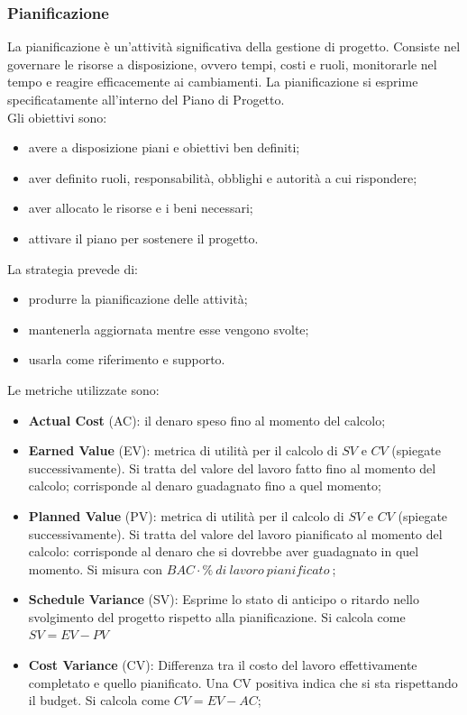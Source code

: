 {	\subsubsection{Pianificazione}
La pianificazione è un'attività significativa della gestione di progetto. Consiste nel governare le	risorse a disposizione, ovvero tempi, costi e ruoli, monitorarle nel tempo e reagire efficacemente ai cambiamenti. La pianificazione si esprime specificatamente all'interno del Piano di Progetto.\\
Gli obiettivi sono:
\begin{itemize}
	\item avere a disposizione piani e obiettivi ben definiti;
	\item aver definito ruoli, responsabilità, obblighi e autorità a cui rispondere;
	\item aver allocato le risorse e i beni necessari;
	\item attivare il piano per sostenere il progetto.
\end{itemize}
La strategia prevede di: 
\begin{itemize}
	\item produrre la pianificazione delle attività;
	\item mantenerla aggiornata mentre esse vengono svolte;
	\item usarla come riferimento e supporto.
\end{itemize}
Le metriche utilizzate sono:
\begin{itemize}
	\item \textbf{Actual Cost} (AC): il denaro speso fino al momento del calcolo;
	\item \textbf{Earned Value} (EV): metrica di utilità per il calcolo di $SV$ e $CV$ (spiegate successivamente). Si tratta del valore del lavoro fatto fino al momento del calcolo; corrisponde al denaro guadagnato fino a quel momento;
	\item \textbf{Planned Value} (PV): metrica di utilità per il calcolo di $SV$ e $CV$ (spiegate successivamente). Si tratta del valore del lavoro pianificato al momento del calcolo: corrisponde al denaro che si dovrebbe aver guadagnato in quel momento. Si misura con $BAC \cdot \%\ di\ lavoro\ pianificato\ $;
	\item \textbf{Schedule Variance} (SV): Esprime lo stato di anticipo o ritardo nello svolgimento del progetto rispetto alla pianificazione. Si calcola come $SV = EV - PV$
	\item \textbf{Cost Variance} (CV): Differenza tra il costo del lavoro effettivamente completato e quello
	pianificato. Una CV positiva indica che si sta rispettando il budget. Si calcola come $CV = EV - AC$;
\end{itemize}
}
